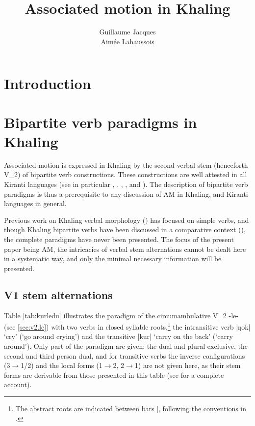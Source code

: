 \documentclass[oneside,a4paper,11pt]{article}
\newcommand{\ipa}[1]{{\phon#1}}
\newcommand{\dhatu}[2]{|\ipa{#1}| `#2'}
\begin{document}
\title{Associated motion in Khaling } 
\author{Guillaume Jacques\\Aimée Lahaussois}
\maketitle
\linenumbers
\section{Introduction}

\section{Bipartite verb paradigms in Khaling}
Associated motion is expressed in Khaling by the second verbal stem (henceforth V_2) of bipartite verb constructions. These constructions are well attested in all Kiranti languages (see in particular \citealt[118-132]{driem87}, \citealt[199-214]{driem93dumi},  \citealt[137-194]{rutgers98yamphu}, \citealt{bickel07chintang}, \citealt[170-172]{doornenbal09} and \citealt[283-328]{schackow15yakkha}). The description of bipartite verb paradigms is thus a prerequisite to any discussion of AM in Khaling, and Kiranti languages in general.

Previous work on Khaling verbal morphology (\citealt{jacques12khaling, jacques16si}) has focused on simple verbs, and though Khaling bipartite verbs have been discussed in a comparative context (\citealt{jacques18bipartite}), the complete paradigms have never been presented. The focus of the present paper being AM, the intricacies of verbal stem alternations cannot be dealt here in a systematic way, and only the minimal necessary information will be presented.

\subsection{V1 stem alternations}

Table \ref{tab:kurledu} illustrates the paradigm of the circumambulative V_2 \ipa{-le-} (see \ref{sec:v2.le}) with two verbs in closed syllable roots,\footnote{The abstract roots are indicated between bars |, following the conventions in \citet{jacques12khaling}.} the intransitive verb \dhatu{ŋok}{cry} (`go around crying') and the transitive \dhatu{kur}{carry on the back} (`carry around'). Only part of the paradigm are given: the dual and plural exclusive, the second and third person dual,  and for transitive verbs the inverse configurations (3$\rightarrow$1/2) and the local forms (1$\rightarrow$2, 2$\rightarrow$1) are not given here, as their stem forms are derivable from those presented in this table (see \citealt{jacques12khaling} for a complete account).
\end{document}
